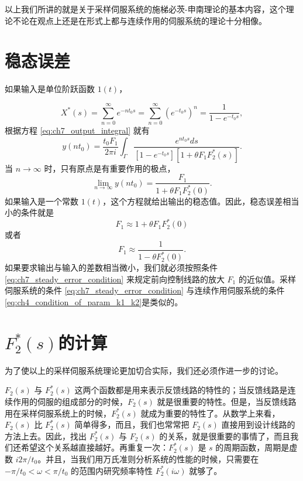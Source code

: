 以上我们所讲的就是关于采样伺服系统的施梯必茨-申南理论的基本内容，这个理论不论在观点上还是在形式上都与连续作用的伺服系统的理论十分相像。


\section{稳态误差}


如果输入是单位阶跃函数 $1(t)$，

\begin{equation*}
X^*(s) = \sum_{n=0}^{\infty} e^{-nt_0 s} = \sum_{n=0}^{\infty} (e^{-t_0 s})^n = \frac{1}{1 - e^{-t_0 s}},
\end{equation*}
根据方程 \eqref{eq:ch7_output_integral} 就有
\begin{equation*}
y(n t_0) = \frac{t_0 F_1}{2 \pi i} \int_{\Gamma} \frac{e^{nt_0 s} ds}{[1 - e^{-t_0 s}][1 + \theta F_1 F_2^* (s)]}.
\end{equation*}
当 $n \to \infty$ 时，只有原点是有重要作用的极点，
\begin{equation}\label{eq:ch7_limit_n_infty_y}
\lim_{n \to \infty} y(n t_0) = \frac{F_1}{1 + \theta F_1 F_2^* (0)}.
\end{equation}
如果输入是一个常数 $1(t)$，这个方程就给出输出的稳态值。因此，稳态误差相当小的条件就是
\begin{equation*}
F_1 \approx 1 + \theta F_1 F_2^* (0)
\end{equation*}
或者
\begin{equation}\label{eq:ch7_steady_error_condition}
F_1 \approx \frac{1}{1 - \theta F_2^* (0)}.
\end{equation}
如果要求输出与输入的差数相当微小，我们就必须按照条件 \eqref{eq:ch7_steady_error_condition} 来规定前向控制线路的放大 $F_1$ 的近似值。采样伺服系统的条件 \eqref{eq:ch7_steady_error_condition} 与连续作用伺服系统的条件\eqref{eq:ch4_condition_of_param_k1_k2}是类似的。

\section{$F_2^* (s)$的计算}


为了使以上的采样伺服系统理论更加切合实际，我们还必须作进一步的讨论。

$F_2(s)$ 与 $F_2^*(s)$ 这两个函数都是用来表示反馈线路的特性的；当反馈线路是连续作用的伺服的组成部分的时候，$F_2(s)$ 就是很重要的特性。但是，当反馈线路用在采样伺服系统上的时候，$F_2^*(s)$ 就成为重要的特性了。从数学上来看，$F_2(s)$ 比 $F_2^*(s)$ 简单得多，而且，我们也常常把 $F_2(s)$ 直接用到设计线路的方法上去。因此，找出 $F_2^*(s)$ 与 $F_2(s)$ 的关系，就是很重要的事情了，而且我们还希望这个关系越直接越好。再重复一次：$F_2^*(s)$ 是 $s$ 的周期函数，周期是虚数 $i2\pi / t_0$。并且，当我们用万氏准则分析系统的性能的时候，只需要在 $-\pi / t_0 < \omega < \pi / t_0$ 的范围内研究频率特性 $F_2^*(i\omega)$ 就够了。

